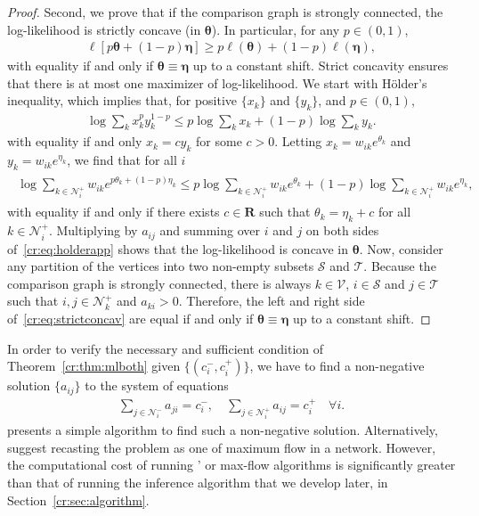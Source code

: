 \begin{proof}
Second, we prove that if the comparison graph is strongly connected, the log-likelihood is strictly concave (in $\bm{\theta}$).
In particular, for any $p \in (0,1)$,
\begin{align}
\label{cr:eq:strictconcav}
\ell \left[ p \bm{\theta} + (1-p) \bm{\eta} \right] \ge p \ell(\bm{\theta}) + (1-p) \ell(\bm{\eta}),
\end{align}
with equality if and only if $\bm{\theta} \equiv \bm{\eta}$ up to a constant shift.
Strict concavity ensures that there is at most one maximizer of log-likelihood.
We start with Hölder's inequality, which implies that, for positive $\{ x_k \}$ and $\{ y_k \}$, and $p \in (0,1)$,
\begin{align*}
\log \sum_k x_k^p y_k^{1-p} \le p \log \sum_k x_k + (1-p) \log \sum_k y_k.
\end{align*}
with equality if and only $x_k = c y_k$ for some $c > 0$.
Letting $x_k = w_{ik} e^{\theta_k}$ and $y_k = w_{ik} e^{\eta_k}$, we find that for all $i$
\begin{align}
\label{cr:eq:holderapp}
\begin{aligned}
\log \sum_{k \in \mathcal{N}^+_i} w_{ik} e^{p \theta_k + (1-p) \eta_k}
    \le p \log\!\sum_{k \in \mathcal{N}^+_i}\!w_{ik} e^{\theta_k} + (1-p) \log\!\sum_{k \in \mathcal{N}^+_i}\!w_{ik} e^{\eta_k},
\end{aligned}
\end{align}
with equality if and only if there exists $c \in \mathbf{R}$ such that $\theta_k = \eta_k + c$ for all $k \in \mathcal{N}^+_{i}$.
Multiplying by $a_{ij}$ and summing over $i$ and $j$ on both sides of~\eqref{cr:eq:holderapp} shows that the log-likelihood is concave in $\bm{\theta}$.
Now, consider any partition of the vertices into two non-empty subsets $\mathcal{S}$ and $\mathcal{T}$.
Because the comparison graph is strongly connected, there is always $k \in \mathcal{V}$, $i \in \mathcal{S}$ and $j \in \mathcal{T}$ such that $i, j \in \mathcal{N}^+_k$ and $a_{ki} > 0$.
Therefore, the left and right side of~\eqref{cr:eq:strictconcav} are equal if and only if $\bm{\theta} \equiv \bm{\eta}$ up to a constant shift.
\end{proof}

In order to verify the necessary and sufficient condition of Theorem~\ref{cr:thm:mlboth} given $\{ (c^-_i, c^+_i) \}$, we have to find a non-negative solution $\{ a_{ij} \}$ to the system of equations
\begin{align*}
\sum_{j \in \mathcal{N}^-_i} a_{ji} = c^-_i, \quad
\sum_{j \in \mathcal{N}^+_i} a_{ij} = c^+_i \quad \forall i.
\end{align*}
\citet{dines1926positive} presents a simple algorithm to find such a non-negative solution.
Alternatively, \citet{kumar2015inverting} suggest recasting the problem as one of maximum flow in a network.
However, the computational cost of running \citeauthor{dines1926positive}' or max-flow algorithms is significantly greater than that of running the inference algorithm that we develop later, in Section~\ref{cr:sec:algorithm}.

